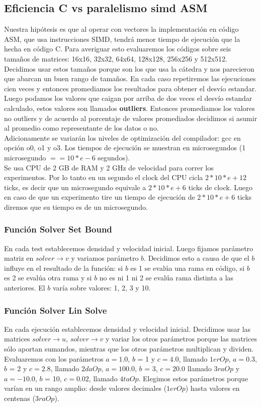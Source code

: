 \subsection{Eficiencia C vs paralelismo simd ASM}
Nuestra hipótesis es que al operar con vectores la implementación en código ASM, que usa instrucciones SIMD, tendrá menor tiempo de ejecución que la hecha en código C. Para averiguar esto evaluaremos los códigos sobre seis tamaños de matrices: 16x16, 32x32, 64x64, 128x128, 256x256 y 512x512. Decidimos usar estos tamaños porque son los que usa la cátedra y nos parecieron que abarcan un buen rango de tamaños. En cada caso repetiremos las ejecuciones cien veces y entonces promediamos los resultados para obtener el desvío estandar. Luego podamos los valores que caigan por arriba de dos veces el desvío estandar calculado, estos valores son llamados \textbf{outliers}. Entonces promediamos los valores no outliers y de acuerdo al porcentaje de valores promediados decidimos si asumir al promedio como representante de los datos o no. \\
Adicionamente se variarán los niveles de optimización del compilador: gcc en opción o0, o1 y o3. Los tiempos de ejecución se muestran en microsegundos (1 microsegundo $== 10*e-6$ segundos).\\
Se usa CPU de 2 GB de RAM y 2 GHz de velocidad para correr los experimentos. Por lo tanto en un segundo el clock del CPU cicla $2*10*e+12$ ticks, es decir que un microsegundo equivale a $2*10*e+6$ ticks de clock. Luego en caso de que un experimento tire un tiempo de ejecución de $2*10*e+6$ ticks diremos que su tiempo es de un microsegundo.
\subsubsection{Función Solver Set Bound}
En cada test establecemos densidad y velocidad inicial. Luego fijamos parámetro matriz en $solver\rightarrow v$ y variamos parámetro $b$. Decidimos esto a causa de que el $b$ influye en el resultado de la función: si $b$ es 1 se evalúa una rama en código, si $b$ es 2 se evalúa otra rama y si $b$ no es ni 1 ni 2 se evalúa rama distinta a las anteriores.
El $b$ varía sobre valores: 1, 2, 3 y 10.
\subsubsection{Función Solver Lin Solve}
En cada ejecución establecemos densidad y velocidad inicial. Decidimos usar las matrices $solver\rightarrow u$, $solver\rightarrow v$ y variar los otros parámetros porque las matrices sólo aportan sumandos, mientras que los otros parámetros multiplican y dividen.
Evaluaremos con los parámetros $a = 1.0 $, $b$ = 1 y $c = 4.0$, llamado $1erOp$, $a = 0.3$, $b$ = 2 y $c = 2.8$, llamado $2daOp$, $a = 100.0$, $b$ = 3, $c = 20.0$ llamado $3raOp$ y $a = -10.0$, $b$ = 10, $c = 0.02$, llamado $4taOp$. Elegimos estos parámetros porque varían en un rango amplio: desde valores decimales ($1erOp$) hasta valores en centenas ($3raOp$).


